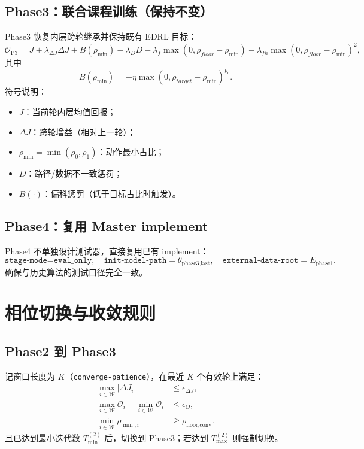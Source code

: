 \documentclass[UTF8,11pt,a4paper]{ctexart}
\begin{document}
\subsection{Phase3：联合课程训练（保持不变）}
Phase3 恢复内层跨轮继承并保持既有 EDRL 目标：
\begin{equation}
\mathcal{O}_{\text{P3}}=
J
+\lambda_{\Delta J}\Delta J
+B(\rho_{\min})
-\lambda_D D
-\lambda_f \max(0,\rho_{floor}-\rho_{\min})
-\lambda_{fh}\max(0,\rho_{floor}-\rho_{\min})^2,
\end{equation}
其中
\begin{equation}
B(\rho_{\min})=-\eta\max(0,\rho_{target}-\rho_{\min})^{p_c}.
\end{equation}
符号说明：
\begin{itemize}
\item \(J\)：当前轮内层均值回报；
\item \(\Delta J\)：跨轮增益（相对上一轮）；
\item \(\rho_{\min}=\min(\rho_0,\rho_1)\)：动作最小占比；
\item \(D\)：路径/数据不一致惩罚；
\item \(B(\cdot)\)：偏科惩罚（低于目标占比时触发）。
\end{itemize}

\subsection{Phase4：复用 Master implement}
Phase4 不单独设计测试器，直接复用已有 implement：
\begin{equation}
\texttt{stage-mode=eval\_only},
\quad
\texttt{init-model-path}=\theta_{\text{phase3,last}},
\quad
\texttt{external-data-root}=E_{\text{phase1}}.
\end{equation}
确保与历史算法的测试口径完全一致。

\section{相位切换与收敛规则}
\subsection{Phase2 到 Phase3}
记窗口长度为 \(K\)（\texttt{converge-patience}），在最近 \(K\) 个有效轮上满足：
\begin{align}
\max_{i\in\mathcal{W}}|\Delta J_i| &\le \epsilon_{\Delta J},\\
\max_{i\in\mathcal{W}}\mathcal{O}_i-\min_{i\in\mathcal{W}}\mathcal{O}_i &\le \epsilon_O,\\
\min_{i\in\mathcal{W}}\rho_{\min,i} &\ge \rho_{\text{floor,conv}}.
\end{align}
且已达到最小迭代数 \(T_{\min}^{(2)}\) 后，切换到 Phase3；若达到 \(T_{\max}^{(2)}\) 则强制切换。
\end{document}
